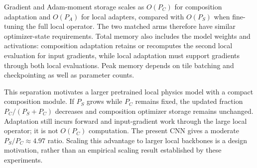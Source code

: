 Gradient and Adam-moment storage scales as $O(P_C)$ for composition
adaptation and $O(P_A)$ for local adapters, compared with $O(P_S)$ when
fine-tuning the full local operator. The two matched arms therefore have
similar optimizer-state requirements. Total memory also includes the model
weights and activations: composition adaptation retains or recomputes the
second local evaluation for input gradients, while local adaptation must
support gradients through both local evaluations. Peak memory depends on
tile batching and checkpointing as well as parameter counts.

This separation motivates a larger pretrained local physics model with a
compact composition module. If $P_S$ grows while $P_C$ remains fixed, the
updated fraction $P_C/(P_S+P_C)$ decreases and composition optimizer storage
remains unchanged. Adaptation still incurs forward and input-gradient work
through the large local operator; it is not $O(P_C)$ computation. The present
CNN gives a moderate $P_S/P_C\approx4.97$ ratio. Scaling this advantage to
larger local backbones is a design motivation, rather than an empirical
scaling result established by these experiments.

